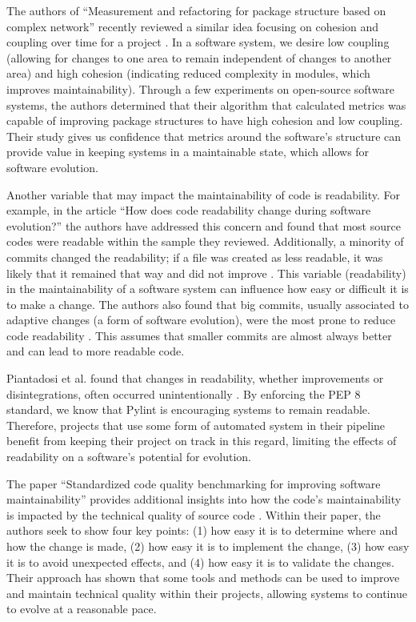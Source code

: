 \documentclass[12pt,conference]{IEEEtran}
\begin{document}
The authors of ``Measurement and refactoring for package structure based on complex network'' recently reviewed a similar idea focusing on cohesion and coupling over time for a project \cite{zhou:2020}. In a software system, we desire low coupling (allowing for changes to one area to remain independent of changes to another area) and high cohesion (indicating reduced complexity in modules, which improves maintainability). Through a few experiments on open-source software systems, the authors determined that their algorithm that calculated metrics was capable of improving package structures to have high cohesion and low coupling. Their study gives us confidence that metrics around the software's structure can provide value in keeping systems in a maintainable state, which allows for software evolution.

Another variable that may impact the maintainability of code is readability. For example, in the article ``How does code readability change during software evolution?'' the authors have addressed this concern and found that most source codes were readable within the sample they reviewed. Additionally, a minority of commits changed the readability; if a file was created as less readable, it was likely that it remained that way and did not improve \cite{piantadosi:2020}. This variable (readability) in the maintainability of a software system can influence how easy or difficult it is to make a change. The authors also found that big commits, usually associated to adaptive changes (a form of software evolution), were the most prone to reduce code readability \cite{piantadosi:2020}. This assumes that smaller commits are almost always better and can lead to more readable code.

Piantadosi et al. found that changes in readability, whether improvements or disintegrations, often occurred unintentionally \cite{piantadosi:2020}. By enforcing the PEP 8 standard, we know that Pylint is encouraging systems to remain readable. Therefore, projects that use some form of automated system in their pipeline benefit from keeping their project on track in this regard, limiting the effects of readability on a software's potential for evolution.

The paper ``Standardized code quality benchmarking for improving software maintainability'' provides additional insights into how the code's maintainability is impacted by the technical quality of source code \cite{baggen:2012}. Within their paper, the authors seek to show four key points: (1) how easy it is to determine where and how the change is made, (2) how easy it is to implement the change, (3) how easy it is to avoid unexpected effects, and (4) how easy it is to validate the changes. Their approach has shown that some tools and methods can be used to improve and maintain technical quality within their projects, allowing systems to continue to evolve at a reasonable pace.
\end{document}
